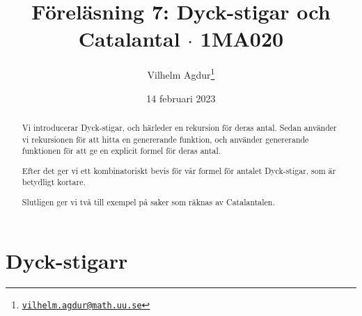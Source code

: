 \documentclass{tufte-handout}
\title{Föreläsning 7: Dyck-stigar och Catalantal $\cdot$ 1MA020}
\author[Vilhelm Agdur]{Vilhelm Agdur\thanks{\href{mailto:vilhelm.agdur@math.uu.se}{\nolinkurl{vilhelm.agdur@math.uu.se}}}}
\date{14 februari 2023}
\begin{document}

\maketitle%

\begin{abstract}
\noindent
Vi introducerar Dyck-stigar, och härleder en rekursion för deras antal. Sedan använder vi rekursionen för att hitta en genererande funktion, och använder genererande funktionen för att ge en explicit formel för deras antal.

Efter det ger vi ett kombinatoriskt bevis för vår formel för antalet Dyck-stigar, som är betydligt kortare.

Slutligen ger vi två till exempel på saker som räknas av Catalantalen.
\end{abstract}

\section{Dyck-stigarr}
\end{document}
